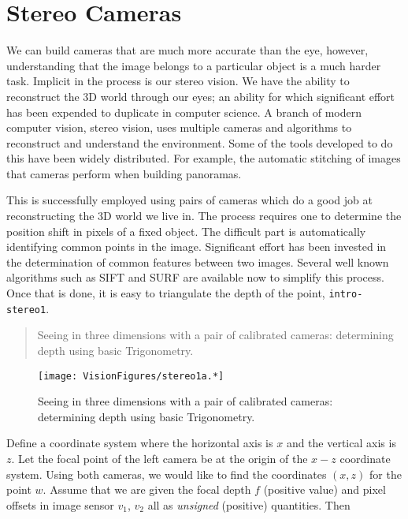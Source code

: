 \hypertarget{stereo-cameras}{%
\section{Stereo Cameras}\label{stereo-cameras}}

We can build cameras that are much more accurate than the eye, however,
understanding that the image belongs to a particular object is a much
harder task. Implicit in the process is our stereo vision. We have the
ability to reconstruct the 3D world through our eyes; an ability for
which significant effort has been expended to duplicate in computer
science. A branch of modern computer vision, stereo vision, uses
multiple cameras and algorithms to reconstruct and understand the
environment. Some of the tools developed to do this have been widely
distributed. For example, the automatic stitching of images that cameras
perform when building panoramas.

This is successfully employed using pairs of cameras which do a good job
at reconstructing the 3D world we live in. The process requires one to
determine the position shift in pixels of a fixed object. The difficult
part is automatically identifying common points in the image.
Significant effort has been invested in the determination of common
features between two images. Several well known algorithms such as SIFT
and SURF are available now to simplify this process. Once that is done,
it is easy to triangulate the depth of the point,
\texttt{intro-stereo1}.

\begin{quote}
Seeing in three dimensions with a pair of calibrated cameras:
determining depth using basic Trigonometry.
\end{quote}

\begin{figure}
\centering
\texttt{[image: VisionFigures/stereo1a.*]}
\caption{Seeing in three dimensions with a pair of calibrated cameras:
determining depth using basic Trigonometry.}
\end{figure}

Define a coordinate system where the horizontal axis is \(x\) and the
vertical axis is \(z\). Let the focal point of the left camera be at the
origin of the \(x-z\) coordinate system. Using both cameras, we would
like to find the coordinates \((x,z)\) for the point \(w\). Assume that
we are given the focal depth \(f\) (positive value) and pixel offsets in
image sensor \(v_1\), \(v_2\) all as \emph{unsigned} (positive)
quantities. Then


